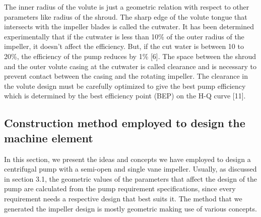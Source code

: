 \documentclass[11pt,a4paper]{scrartcl}
\begin{document}
The inner radius of the volute is just a geometric relation with respect to other parameters like radius of the shroud. The sharp edge of the volute tongue that intersects with the impeller blades is called the cutwater. It has been determined experimentally that if the cutwater is less than 10\% of the outer radius of the impeller, it doesn’t affect the efficiency. But, if the cut water is between 10 to 20\%, the efficiency of the pump reduces by 1\% [6]. The space between the shroud and the outer volute casing at the cutwater is called clearance and is necessary to prevent contact between the casing and the rotating impeller. The clearance in the volute design must be carefully optimized to give the best pump efficiency which is determined by the best efficiency point (BEP) on the H-Q curve [11].   

\subsection{Construction method employed to design the machine element}
In this section, we present the ideas and concepts we have employed to design a centrifugal pump with a semi-open and single vane impeller. Usually, as discussed in section 3.1, the geometric values of the parameters that affect the design of the pump are calculated from the pump requirement specifications, since every requirement needs a respective design that best suits it. The method that we generated the impeller design is mostly geometric making use of various concepts.
\end{document}
